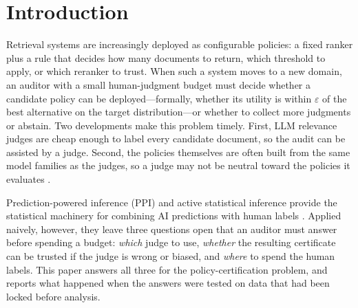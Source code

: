 \documentclass{article}
\newcommand{\eps}{\varepsilon}
\begin{document}
\section{Introduction}
Retrieval systems are increasingly deployed as configurable policies: a fixed ranker plus a rule that decides how many documents to return, which threshold to apply, or which reranker to trust. When such a system moves to a new domain, an auditor with a small human-judgment budget must decide whether a candidate policy can be deployed---formally, whether its utility is within $\eps$ of the best alternative on the target distribution---or whether to collect more judgments or abstain. Two developments make this problem timely. First, LLM relevance judges are cheap enough to label every candidate document, so the audit can be assisted by a judge. Second, the policies themselves are often built from the same model families as the judges, so a judge may not be neutral toward the policies it evaluates \citep{balog2025rankers}.

Prediction-powered inference (PPI) and active statistical inference provide the statistical machinery for combining AI predictions with human labels \citep{angelopoulos2023ppi,angelopoulos2023ppipp,zrnic2024active}. Applied naively, however, they leave three questions open that an auditor must answer before spending a budget: \emph{which} judge to use, \emph{whether} the resulting certificate can be trusted if the judge is wrong or biased, and \emph{where} to spend the human labels. This paper answers all three for the policy-certification problem, and reports what happened when the answers were tested on data that had been locked before analysis.
\end{document}
